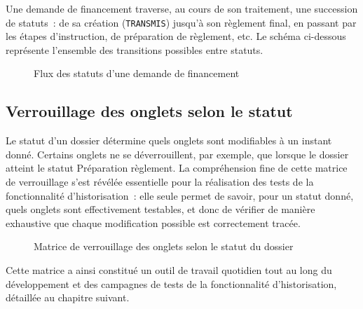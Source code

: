 Une demande de financement traverse, au cours de son traitement, une
succession de statuts~: de sa création (\texttt{TRANSMIS}) jusqu'à son
règlement final, en passant par les étapes d'instruction, de préparation
de règlement, etc. Le schéma ci-dessous représente l'ensemble des
transitions possibles entre statuts.

\begin{figure}[H]
  \centering
  \caption{Flux des statuts d'une demande de financement}
  \label{fig:flux-statuts}
\end{figure}

\subsection{Verrouillage des onglets selon le statut}

Le statut d'un dossier détermine quels onglets sont modifiables à un
instant donné. Certains onglets ne se déverrouillent, par exemple, que
lorsque le dossier atteint le statut \og{}Préparation règlement\fg{}. La
compréhension fine de cette matrice de verrouillage s'est révélée
essentielle pour la réalisation des tests de la fonctionnalité
d'historisation~: elle seule permet de savoir, pour un statut donné,
quels onglets sont effectivement testables, et donc de vérifier de
manière exhaustive que chaque modification possible est correctement
tracée.

\begin{figure}[H]
  \centering
  \caption{Matrice de verrouillage des onglets selon le statut du dossier}
  \label{fig:verrou-statuts}
\end{figure}

Cette matrice a ainsi constitué un outil de travail quotidien tout au
long du développement et des campagnes de tests de la fonctionnalité
d'historisation, détaillée au chapitre suivant.